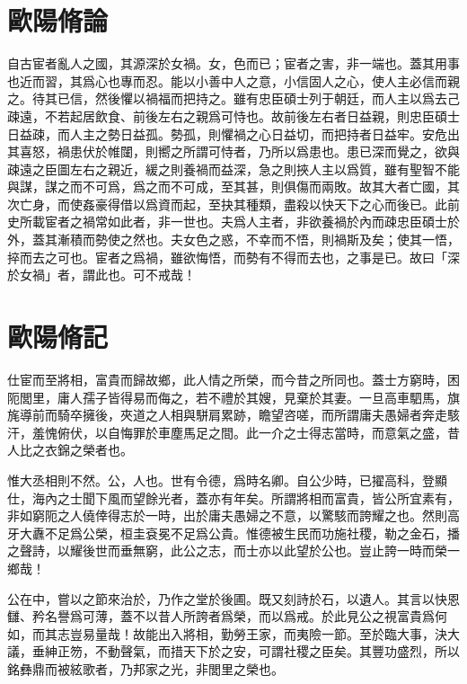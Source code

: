 \section[五代史宦者傳論\quad{\small 歐陽脩}]{{\normalsize 歐陽脩}\quad{}論}
自古宦者亂人之國，其源深於女禍。女，色而已；宦者之害，非一端也。蓋其用事也近而習，其爲心也專而忍。能以小善中人之意，小信固人之心，使人主必信而親之。待其已信，然後懼以禍福而把持之。雖有忠臣碩士列于朝廷，而人主以爲去己疎遠，不若起居飲食、前後左右之親爲可恃也。故前後左右者日益親，則忠臣碩士日益疎，而人主之勢日益孤。勢孤，則懼禍之心日益切，而把持者日益牢。安危出其喜怒，禍患伏於帷闥，則嚮之所謂可恃者，乃所以爲患也。患已深而覺之，欲與疎遠之臣圖左右之親近，緩之則養禍而益深，急之則挾人主以爲質，雖有聖智不能與謀，謀之而不可爲，爲之而不可成，至其甚，則俱傷而兩敗。故其大者亡國，其次亡身，而使姦豪得借以爲資而起，至抉其種類，盡殺以快天下之心而後已。此前史所載宦者之禍常如此者，非一世也。夫爲人主者，非欲養禍於內而疎忠臣碩士於外，蓋其漸積而勢使之然也。夫女色之惑，不幸而不悟，則禍斯及矣；使其一悟，捽而去之可也。宦者之爲禍，雖欲悔悟，而勢有不得而去也，之事是已。故曰「深於女禍」者，謂此也。可不戒哉！

\section[相州晝錦堂記\quad{\small 歐陽脩}]{{\normalsize 歐陽脩}\quad{}記}
仕宦而至將相，富貴而歸故鄉，此人情之所榮，而今昔之所同也。蓋士方窮時，困阨閭里，庸人孺子皆得易而侮之，若不禮於其嫂，見棄於其妻。一旦高車駟馬，旗旄導前而騎卒擁後，夾道之人相與駢肩累跡，瞻望咨嗟，而所謂庸夫愚婦者奔走駭汗，羞愧俯伏，以自悔罪於車塵馬足之間。此一介之士得志當時，而意氣之盛，昔人比之衣錦之榮者也。

惟大丞相則不然。公，人也。世有令德，爲時名卿。自公少時，已擢高科，登顯仕，海內之士聞下風而望餘光者，蓋亦有年矣。所謂將相而富貴，皆公所宜素有，非如窮阨之人僥倖得志於一時，出於庸夫愚婦之不意，以驚駭而誇耀之也。然則高牙大纛不足爲公榮，桓圭袞冕不足爲公貴。惟德被生民而功施社稷，勒之金石，播之聲詩，以耀後世而垂無窮，此公之志，而士亦以此望於公也。豈止誇一時而榮一鄉哉！

公在中，嘗以之節來治於，乃作之堂於後圃。既又刻詩於石，以遺人。其言以快恩讎、矜名譽爲可薄，蓋不以昔人所誇者爲榮，而以爲戒。於此見公之視富貴爲何如，而其志豈易量哉！故能出入將相，勤勞王家，而夷險一節。至於臨大事，決大議，垂紳正笏，不動聲氣，而措天下於之安，可謂社稷之臣矣。其豐功盛烈，所以銘彝鼎而被絃歌者，乃邦家之光，非閭里之榮也。

